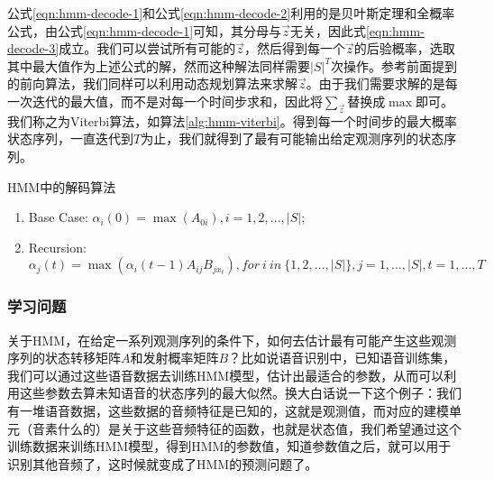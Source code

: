 公式\ref{eqn:hmm-decode-1}和公式\ref{eqn:hmm-decode-2}利用的是贝叶斯定理和全概率公式，由公式\ref{eqn:hmm-decode-1}可知，其分母与$\vec{z}$无关，因此式\ref{eqn:hmm-decode-3}成立。我们可以尝试所有可能的$\vec{z}$，然后得到每一个$\vec{z}$的后验概率，选取其中最大值作为上述公式的解，然而这种解法同样需要$|S|^{T}$次操作。参考前面提到的前向算法，我们同样可以利用动态规划算法来求解$\vec{z}$。由于我们需要求解的是每一次迭代的最大值，而不是对每一个时间步求和，因此将$\sum_{\vec{z}}$替换成$\max$即可。我们称之为Viterbi算法，如算法\ref{alg:hmm-viterbi}。得到每一个时间步的最大概率状态序列，一直迭代到$T$为止，我们就得到了最有可能输出给定观测序列的状态序列。
\begin{algorithm}
\caption{HMM中的解码算法} 
\label{alg:hmm-viterbi}
\begin{enumerate}
  \item Base Case: $\alpha_{i}(0) = \max(A_{0i}), i=1,2,...,|S|$;
  \item Recursion: $\alpha_{j}(t) = \max(\alpha_{i}(t-1)A_{ij}B_{jx_{t}}), for\  i\  in\  \{1,2,...,|S|\} , j = 1,...,|S|, t=1,...,T$
\end{enumerate}
\end{algorithm}

\subsubsection{学习问题}
关于HMM，在给定一系列观测序列的条件下，如何去估计最有可能产生这些观测序列的状态转移矩阵$A$和发射概率矩阵$B$？比如说语音识别中，已知语音训练集，我们可以通过这些语音数据去训练HMM模型，估计出最适合的参数，从而可以利用这些参数去算未知语音的状态序列的最大似然。换大白话说一下这个例子：我们有一堆语音数据，这些数据的音频特征是已知的，这就是观测值，而对应的建模单元（音素什么的）是关于这些音频特征的函数，也就是状态值，我们希望通过这个训练数据来训练HMM模型，得到HMM的参数值，知道参数值之后，就可以用于识别其他音频了，这时候就变成了HMM的预测问题了。

